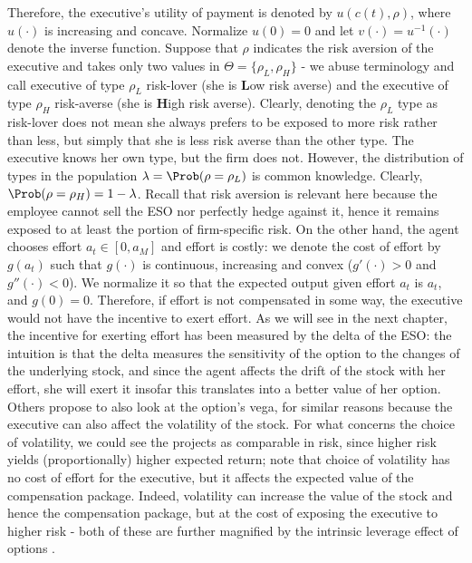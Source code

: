 Therefore, the executive's utility of payment is denoted by $u(c(t), \rho)$, where $u(\cdot)$ is increasing and concave. Normalize $u(0) = 0$ and let $v(\cdot) = u^{-1}(\cdot)$ denote the inverse function. Suppose that $\rho$ indicates the risk aversion of the executive and takes only two values in $\Theta = \{\rho_L, \rho_H \}$ - we abuse terminology and call executive of type $\rho_L$ risk-lover (she is \textbf{L}ow risk averse) and the executive of type $\rho_H$ risk-averse (she is \textbf{H}igh risk averse). Clearly, denoting the $\rho_L$ type as risk-lover does not mean she always prefers to be exposed to more risk rather than less, but simply that she is less risk averse than the other type. The executive knows her own type, but the firm does not. However, the distribution of types in the population $\lambda = \Prob(\rho = \rho_L)$ is common knowledge. Clearly, $\Prob(\rho = \rho_H) = 1 - \lambda$. Recall that risk aversion is relevant here because the employee cannot sell the ESO nor perfectly hedge against it, hence it remains exposed to at least the portion of firm-specific risk.
On the other hand, the agent chooses effort $a_t \in [0, a_M]$ and effort is costly: we denote the cost of effort by $g(a_t)$ such that $g(\cdot)$ is continuous, increasing and convex ($g'(\cdot) > 0$ and $g''(\cdot)<0$). We normalize it so that the expected output given effort $a_t$ is $a_t$, and $g(0) = 0$. Therefore, if effort is not compensated in some way, the executive would not have the incentive to exert effort. As we will see in the next chapter, the incentive for exerting effort has been measured by the delta of the ESO: %
the intuition is that the delta measures the sensitivity of the option to the changes of the underlying stock, and since the agent affects the drift of the stock with her effort, she will exert it insofar this translates into a better value of her option. Others propose to also look at the option's vega, for similar reasons because the executive can also affect the volatility of the stock. For what concerns the choice of volatility, we could see the projects as comparable in risk, since higher risk yields (proportionally) higher expected return; note that choice of volatility has no cost of effort for the executive, but it affects the expected value of the compensation package. Indeed, volatility can increase the value of the stock and hence the compensation package, but at the cost of exposing the executive to higher risk - both of these are further magnified by the intrinsic leverage effect of options \cite{cadenillas2005executive}.


